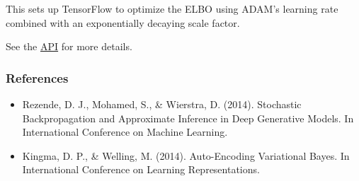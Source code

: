 This sets up TensorFlow to optimize the ELBO using ADAM's learning rate
combined with an exponentially decaying scale factor.

See the \href{api/index.html}{API} for more details.

\subsubsection{References}\label{references}

\begin{itemize}
\item
  Rezende, D. J., Mohamed, S., & Wierstra, D. (2014). Stochastic
  Backpropagation and Approximate Inference in Deep Generative Models.
  In International Conference on Machine Learning.
\item
  Kingma, D. P., & Welling, M. (2014). Auto-Encoding Variational
  Bayes. In International Conference on Learning Representations.
\end{itemize}
